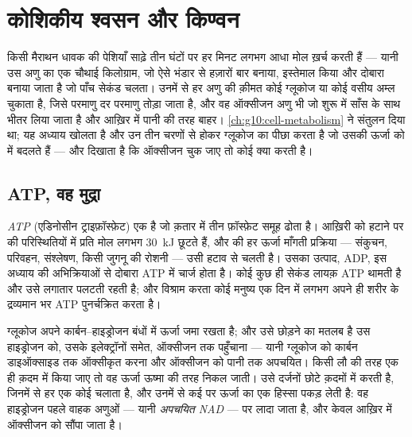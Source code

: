 \chapter{कोशिकीय श्वसन और किण्वन}\label{ch:g12:respiration-fermentation}

किसी मैराथन धावक की पेशियाँ साढ़े तीन घंटों पर हर मिनट लगभग आधा मोल 
ख़र्च करती हैं --- यानी उस अणु का एक चौथाई किलोग्राम, जो ऐसे भंडार से हज़ारों
बार बनाया, इस्तेमाल किया और दोबारा बनाया जाता है जो पाँच सेकंड चलता।
उनमें से हर  अणु की क़ीमत कोई ग्लूकोज या कोई वसीय अम्ल चुकाता है, जिसे
परमाणु दर परमाणु तोड़ा जाता है, और वह ऑक्सीजन अणु भी जो शुरू में साँस के
साथ भीतर लिया जाता है और आख़िर में पानी की तरह बाहर।
\cref{ch:g10:cell-metabolism} ने संतुलन दिया था; यह अध्याय  खोलता
है और उन तीन चरणों से होकर ग्लूकोज का पीछा करता है जो उसकी ऊर्जा को  में
बदलते हैं --- और दिखाता है कि ऑक्सीजन चुक जाए तो कोई  क्या करती है।

\section{ATP, वह मुद्रा}

\begin{definition}[ATP]\label{def:g12:respiration-fermentation:atp}
\emph{ATP} (एडिनोसीन ट्राइफ़ॉस्फ़ेट) एक  है जो
क़तार में तीन फ़ॉस्फ़ेट समूह ढोता है। आख़िरी को हटाने पर  की
परिस्थितियों में प्रति मोल लगभग \qty{30}{kJ} छूटते हैं, और  की हर
ऊर्जा माँगती प्रक्रिया --- संकुचन, परिवहन, संश्लेषण, किसी जुगनू की रोशनी ---
उसी हटाव से चलती है। उसका उत्पाद, ADP, इस अध्याय की अभिक्रियाओं से दोबारा
ATP में चार्ज होता है। कोई  कुछ ही सेकंड लायक़ ATP थामती है और उसे
लगातार पलटती रहती है; और विश्राम करता कोई मनुष्य एक दिन में लगभग अपने ही
शरीर के द्रव्यमान भर ATP पुनर्चक्रित करता है।
\end{definition}

\begin{proposition}[ऊर्जा कहाँ है]\label{prop:g12:respiration-fermentation:oxidation}
ग्लूकोज अपने कार्बन--हाइड्रोजन बंधों में ऊर्जा जमा रखता है; और उसे छोड़ने
का मतलब है उस हाइड्रोजन को, उसके इलेक्ट्रॉनों समेत, ऑक्सीजन तक पहुँचाना ---
यानी ग्लूकोज को कार्बन डाइऑक्साइड तक ऑक्सीकृत करना और ऑक्सीजन को पानी तक
अपचयित। किसी लौ की तरह एक ही क़दम में किया जाए तो वह ऊर्जा ऊष्मा की तरह
निकल जाती।  उसे दर्जनों छोटे क़दमों में करती है, जिनमें से हर एक कोई
 चलाता है, और उनमें से कई पर ऊर्जा का एक हिस्सा पकड़ लेती है: वह
हाइड्रोजन पहले वाहक अणुओं --- यानी \emph{अपचयित NAD} --- पर लादा जाता है,
और केवल आख़िर में ऑक्सीजन को सौंपा जाता है।
\end{proposition}
\admitted


